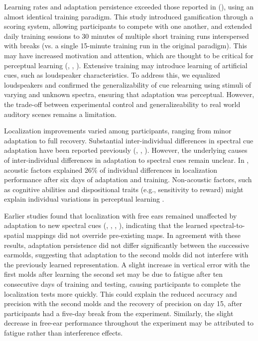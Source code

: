 \documentclass[preprint]{JASA}
\begin{document}
Learning rates and adaptation persistence exceeded those reported in (\citeyear{trapeau_fast_2016}), using an almost identical training paradigm. This study introduced gamification through a scoring system, allowing participants to compete with one another, and extended daily training sessions to 30 minutes of multiple short training runs interspersed with breaks (vs. a single 15-minute training run in the original paradigm). This may have increased motivation and attention, which are thought to be critical for perceptual learning (\citet{amitay_discrimination_2006}, \citet{mcgraw_introduction_2009}, \citet{molloy_less_2012}). Extensive training may introduce learning of artificial cues, such as loudspeaker characteristics. To address this, we equalized loudspeakers and confirmed the generalizability of cue relearning using stimuli of varying and unknown spectra, ensuring that adaptation was perceptual. However, the trade-off between experimental control and generalizeability to real world auditory scenes remains a limitation. 

Localization improvements varied among participants, ranging from minor adaptation to full recovery. Substantial inter-individual differences in spectral cue adaptation have been reported previously (\citet{hofman_relearning_1998}, \citet{van_wanrooij_relearning_2005}, \citet{trapeau_fast_2016}). However, the underlying causes of inter-individual differences in adaptation to spectral cues remain unclear. In \citeyear{trapeau_fast_2016}, acoustic factors explained 26\% of individual differences in localization performance after six days of adaptation and training. Non-acoustic factors, such as cognitive abilities and dispositional traits (e.g., sensitivity to reward) might explain individual variations in perceptual learning \citep{dale_individual_2021}. 

Earlier studies found that localization with free ears remained unaffected by adaptation to new spectral cues (\citet{hofman_relearning_1998}, \citet{van_wanrooij_relearning_2005}, \citet{carlile_relearning_2014}, \citet{trapeau_fast_2016}), indicating that the learned spectral-to-spatial mappings did not override pre-existing maps. In agreement with these results, adaptation persistence did not differ significantly between the successive earmolds, suggesting that adaptation to the second molds did not interfere with the previously learned representation. A slight increase in vertical error with the first molds after learning the second set may be due to fatigue after ten consecutive days of training and testing, causing participants to complete the localization tests more quickly. This could explain the reduced accuracy and precision with the second molds and the recovery of precision on day 15, after participants had a five-day break from the experiment. Similarly, the slight decrease in free-ear performance throughout the experiment may be attributed to fatigue rather than interference effects. 
\end{document}
